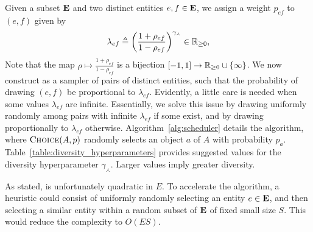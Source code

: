 Given a subset ${\bf E}$ and two distinct entities $e, f \in {\bf E}$,
we assign a weight $p_{ef}$ to $(e, f)$ given by
\begin{align}
    \lambda_{ef} \triangleq \left(
        \frac{1 + \rho_{ef}}{1 - \rho_{ef}}
    \right)^{\gamma_\curlywedge} \in \mathbb R_{\geq 0},
\end{align}
Note that the map $\rho \mapsto \frac{1 + \rho_{ef}}{1 - \rho_{ef}}$
is a bijection $[-1, 1] \to \mathbb R_{\geq 0} \cup \left\lbrace \infty \right\rbrace$.
We now construct \Scheduler as a sampler of pairs of distinct entities,
such that the probability of drawing $(e, f)$ be proportional to $\lambda_{ef}$.
Evidently, a little care is needed when some values $\lambda_{ef}$ are infinite.
Essentially, we solve this issue by drawing uniformly randomly among pairs
with infinite $\lambda_{ef}$ if some exist,
and by drawing proportionally to $\lambda_{ef}$ otherwise.
Algorithm~\ref{alg:scheduler} details the algorithm,
where $\textsc{Choice} (A, p)$ randomly selects an object $a$ of $A$ with probability $p_a$.
Table~\ref{table:diversity_hyperparameters} provides suggested values
for the diversity hyperparameter $\gamma_\curlywedge$.
Larger values imply greater diversity.

As stated, \Scheduler{} is unfortunately quadratic in $E$.
To accelerate the algorithm, a heuristic could consist of uniformly randomly selecting an entity $e \in {\bf E}$,
and then selecting a similar entity within a random subset of ${\bf E}$ of fixed small size $S$.
This would reduce the complexity to $O(ES)$.



